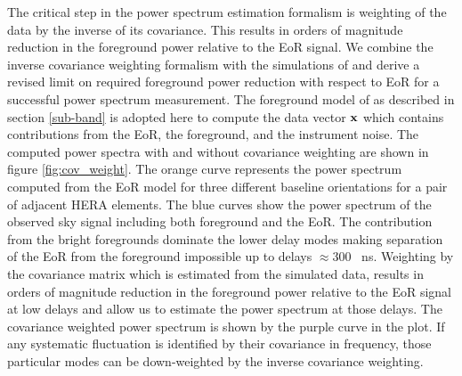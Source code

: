 \documentclass[twocolumn]{emulateapj}
\begin{document}
  The critical step in the power spectrum estimation formalism is weighting of the data by the inverse of its covariance. This results in orders of magnitude reduction in the foreground power relative to the EoR signal. We combine the inverse covariance weighting formalism with the
   simulations of \cite{Thyagarajan_et_al2016} and derive a revised limit on required foreground power reduction with respect to EoR for a successful power spectrum measurement. The foreground model of
    \cite{Thyagarajan_et_al2016} as described in section \ref{sub-band} is adopted here to compute the 
    data vector $\bold x$ which contains contributions from the EoR, the foreground, and
   the instrument noise. The computed power spectra with and without covariance weighting are shown in figure \ref{fig:cov_weight}. The orange curve represents the power spectrum computed from the EoR model for three different baseline orientations for a pair of adjacent HERA elements.  The blue curves show the power spectrum of the observed sky signal including both foreground and the EoR. The contribution from the bright foregrounds dominate the lower delay modes making separation of the EoR from the foreground impossible up to delays $\approx 300$ ~ns. 
   Weighting by the covariance matrix which is estimated from the simulated data, results in orders of magnitude reduction in the foreground power relative to the EoR signal at low delays and allow us to estimate the power spectrum at those delays. The covariance weighted power spectrum is shown by the purple curve in the plot. If any systematic
    fluctuation is identified by their covariance in frequency, those particular
    modes can be down-weighted by the inverse covariance weighting. 
\end{document}
